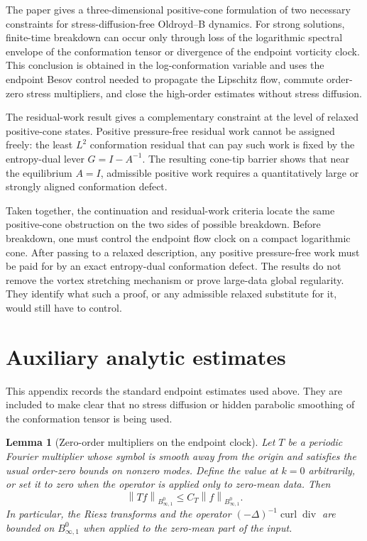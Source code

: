 \documentclass[11pt]{article}
\numberwithin{equation}{section}
\newtheorem{lemma}[theorem]{Lemma}
\newcommand{\Id}{I}
\newcommand{\divv}{\operatorname{div}}
\newcommand{\curl}{\operatorname{curl}}
\newcommand{\norm}[1]{\left\lVert #1\right\rVert}
\begin{document}
The paper gives a three-dimensional positive-cone formulation of two necessary
constraints for stress-diffusion-free Oldroyd--B dynamics.  For strong
solutions, finite-time breakdown can occur only through loss of the logarithmic
spectral envelope of the conformation tensor or divergence of the endpoint
vorticity clock.  This conclusion is obtained in the log-conformation variable
and uses the endpoint Besov control needed to propagate the Lipschitz flow,
commute order-zero stress multipliers, and close the high-order estimates
without stress diffusion.

The residual-work result gives a complementary constraint at the level of
relaxed positive-cone states.  Positive pressure-free residual work cannot be
assigned freely: the least \(L^2\) conformation residual that can pay such work
is fixed by the entropy-dual lever \(G=\Id-A^{-1}\).  The resulting cone-tip
barrier shows that near the equilibrium \(A=\Id\), admissible positive work
requires a quantitatively large or strongly aligned conformation defect.

Taken together, the continuation and residual-work criteria locate the same
positive-cone obstruction on the two sides of possible breakdown.  Before
breakdown, one must control the endpoint flow clock on a compact logarithmic
cone.  After passing to a relaxed description, any positive pressure-free work
must be paid for by an exact entropy-dual conformation defect.  The results do
not remove the vortex stretching mechanism or prove large-data global
regularity.  They identify what such a proof, or any admissible relaxed
substitute for it, would still have to control.

\appendix

\section{Auxiliary analytic estimates}
\label{app:aux}

This appendix records the standard endpoint estimates used above.  They are
included to make clear that no stress diffusion or hidden parabolic smoothing
of the conformation tensor is being used.

\begin{lemma}[Zero-order multipliers on the endpoint clock]
\label{lem:appendix-multiplier}
Let \(T\) be a periodic Fourier multiplier whose symbol is smooth away from
the origin and satisfies the usual order-zero bounds on nonzero modes.  Define
the value at \(k=0\) arbitrarily, or set it to zero when the operator is
applied only to zero-mean data.  Then
\[
  \norm{Tf}_{B^0_{\infty,1}}
  \le C_T\norm{f}_{B^0_{\infty,1}} .
\]
In particular, the Riesz transforms and the operator
\((-\Delta)^{-1}\curl\divv\) are bounded on \(B^0_{\infty,1}\) when applied
to the zero-mean part of the input.
\end{lemma}
\end{document}
